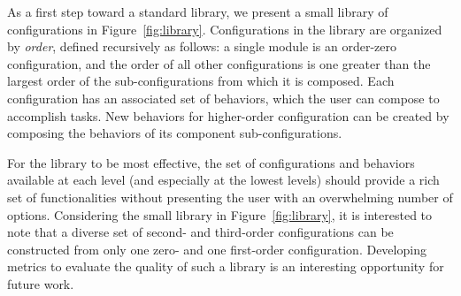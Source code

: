\documentclass[graybox]{svmult}
\begin{document}
As a first step toward a standard library, we present a small library of configurations
in Figure~\ref{fig:library}.
Configurations in the library are organized by \textit{order}, defined recursively
as follows: a single module is an order-zero configuration, and the order of all
other configurations is one greater than the largest order of the sub-configurations
from which it is composed. Each configuration has an associated set of behaviors,
which the user can compose to accomplish tasks.  New behaviors for higher-order configuration can be created by composing the behaviors of its component sub-configurations.

For the library to be most effective, the set of configurations and behaviors available
 at each level (and especially at the lowest levels) should provide a rich set of
 functionalities without presenting the user with an overwhelming number of options. 
 Considering the small library in Figure~\ref{fig:library},
 it is interested to note that a diverse set of second- and third-order configurations can
be constructed from only one zero- and one first-order configuration. Developing metrics to
evaluate the quality of such a library is an interesting opportunity for future work. 
%
\end{document}
